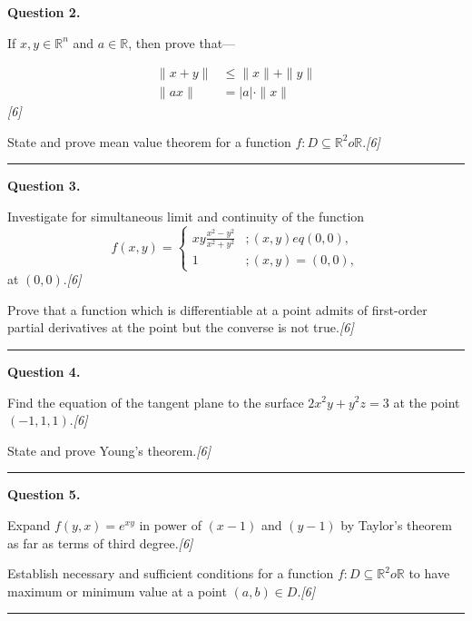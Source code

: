 \documentclass[11pt,a4paper]{article}
\newcommand{\pts}[1]{\hfill   \textit{[#1]}}
\begin{document}
{\noindent   \textbf{Question 2.}

\begin{parts}
  \item If $x, y \in \mathbb{R}^n$ and $a \in \mathbb{R}$, then prove that---
  
\begin{align*}
    \|x + y\| &\le \|x\| + \|y\| \\
    \|ax\| &= |a| \cdot \|x\|
  \end{align*}\pts{6}
  \item State and prove mean value theorem for a function $f : D \subseteq \mathbb{R}^2  o \mathbb{R}$.\pts{6}
\end{parts}
\medskip\rule{\linewidth}{0.2pt}

\medskip


\noindent   \textbf{Question 3.}

\begin{parts}
  \item Investigate for simultaneous limit and continuity of the function
  \[
    f(x,y) = 
\begin{cases}
      xy \frac{x^2 - y^2}{x^2 + y^2} & ; (x,y) 
eq (0,0), \\
      1 & ; (x,y) = (0,0),
    \end{cases}
  \]
  at $(0,0)$.\pts{6}
  \item Prove that a function which is differentiable at a point admits of first-order partial derivatives at the point but the converse is not true.\pts{6}
\end{parts}
\medskip\rule{\linewidth}{0.2pt}

\medskip


\noindent   \textbf{Question 4.}

\begin{parts}
  \item Find the equation of the tangent plane to the surface $2x^2 y + y^2 z = 3$ at the point $(-1, 1, 1)$.\pts{6}
  \item State and prove Young's theorem.\pts{6}
\end{parts}
\medskip\rule{\linewidth}{0.2pt}

\medskip


\noindent   \textbf{Question 5.}

\begin{parts}
  \item Expand $f(y, x) = e^{xy}$ in power of $(x-1)$ and $(y-1)$ by Taylor's theorem as far as terms of third degree.\pts{6}
  \item Establish necessary and sufficient conditions for a function $f : D \subseteq \mathbb{R}^2  o \mathbb{R}$ to have maximum or minimum value at a point $(a,b) \in D$.\pts{6}
\end{parts}
\medskip\rule{\linewidth}{0.2pt}

}
\end{document}
